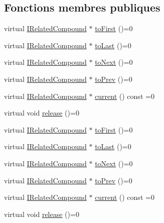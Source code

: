 \subsection*{Fonctions membres publiques}
\begin{DoxyCompactItemize}
\item 
virtual \hyperlink{class_i_related_compound}{I\+Related\+Compound} $\ast$ \hyperlink{class_i_related_compound_iterator_ab2a18f78850606ffcaee16f7d1db94c4}{to\+First} ()=0
\item 
virtual \hyperlink{class_i_related_compound}{I\+Related\+Compound} $\ast$ \hyperlink{class_i_related_compound_iterator_ad5ac46ff87cf4e39e4fb1953966450dd}{to\+Last} ()=0
\item 
virtual \hyperlink{class_i_related_compound}{I\+Related\+Compound} $\ast$ \hyperlink{class_i_related_compound_iterator_ae198441bd33badf5142fdc9850161267}{to\+Next} ()=0
\item 
virtual \hyperlink{class_i_related_compound}{I\+Related\+Compound} $\ast$ \hyperlink{class_i_related_compound_iterator_a0287a7b4d94792470278e6db8b2cd415}{to\+Prev} ()=0
\item 
virtual \hyperlink{class_i_related_compound}{I\+Related\+Compound} $\ast$ \hyperlink{class_i_related_compound_iterator_a5242b1f078acf580b531a58afa2d0cb6}{current} () const  =0
\item 
virtual void \hyperlink{class_i_related_compound_iterator_ac991fc1437ed3d6a4a70d397d8252f23}{release} ()=0
\item 
virtual \hyperlink{class_i_related_compound}{I\+Related\+Compound} $\ast$ \hyperlink{class_i_related_compound_iterator_ab2a18f78850606ffcaee16f7d1db94c4}{to\+First} ()=0
\item 
virtual \hyperlink{class_i_related_compound}{I\+Related\+Compound} $\ast$ \hyperlink{class_i_related_compound_iterator_ad5ac46ff87cf4e39e4fb1953966450dd}{to\+Last} ()=0
\item 
virtual \hyperlink{class_i_related_compound}{I\+Related\+Compound} $\ast$ \hyperlink{class_i_related_compound_iterator_ae198441bd33badf5142fdc9850161267}{to\+Next} ()=0
\item 
virtual \hyperlink{class_i_related_compound}{I\+Related\+Compound} $\ast$ \hyperlink{class_i_related_compound_iterator_a0287a7b4d94792470278e6db8b2cd415}{to\+Prev} ()=0
\item 
virtual \hyperlink{class_i_related_compound}{I\+Related\+Compound} $\ast$ \hyperlink{class_i_related_compound_iterator_a5242b1f078acf580b531a58afa2d0cb6}{current} () const  =0
\item 
virtual void \hyperlink{class_i_related_compound_iterator_ac991fc1437ed3d6a4a70d397d8252f23}{release} ()=0
\end{DoxyCompactItemize}


